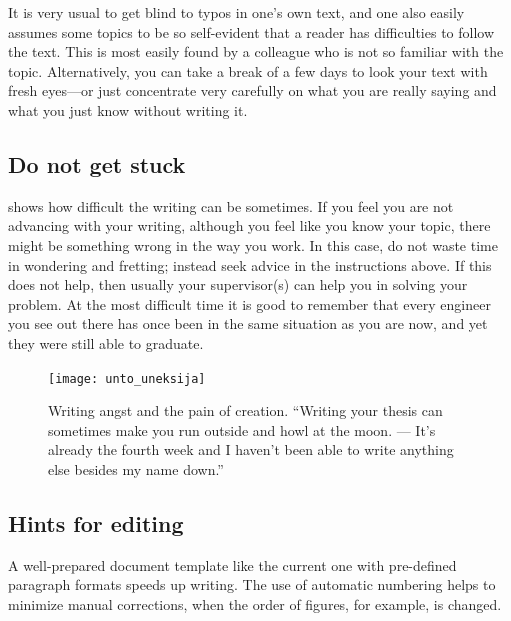 It is very usual to get blind to typos in one’s own text, and one
also easily assumes some topics to be so self-evident that a reader
has difficulties to follow the text. This is most easily found by a
colleague who is not so familiar with the topic. Alternatively, you
can take a break of a few days to look your text with fresh eyes---or
just concentrate very carefully on what you are really saying and
what you just know without writing it.

\subsection{Do not get stuck}

 shows how difficult the writing can be
sometimes. If you feel you are not advancing with your writing,
although you feel like you know your topic, there might be something
wrong in the way you work. In this case, do not waste time in
wondering and fretting; instead seek advice in the instructions
above. If this does not help, then usually your supervisor(s) can
help you in solving your problem. At the most difficult time it is
good to remember that every engineer you see out there has once been
in the same situation as you are now, and yet they were still able to graduate.

\begin{figure}[ht]
\begin{center}
  \texttt{[image: unto\_uneksija]}
\end{center}
\caption{Writing angst and the pain of creation. “Writing your thesis
  can sometimes
  make you run outside and howl at the moon. --- It’s already the
  fourth week and I
haven’t been able to write anything else besides my name down.”}
\label{fig:unto_uneksija}
\end{figure}

\subsection{Hints for editing}

A well-prepared document template like the current one with
pre-defined paragraph formats speeds up writing. The use of automatic
numbering helps to minimize manual corrections, when the order of
figures, for example, is changed.

